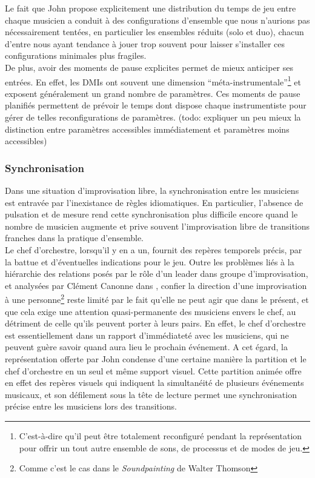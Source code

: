 \noindent Le fait que John propose explicitement une distribution du temps de jeu entre chaque musicien a conduit à des configurations d'ensemble que nous n'aurions pas nécessairement tentées, en particulier les ensembles réduits (solo et duo), chacun d'entre nous ayant tendance à jouer trop souvent pour laisser s'installer ces configurations minimales plus fragiles.\\
\indent De plus, avoir des moments de pause explicites permet de mieux anticiper ses entrées. En effet, les \glspl{DMI} ont souvent une dimension ``méta-instrumentale''\footnote{C'est-à-dire qu'il peut être totalement reconfiguré pendant la représentation pour offrir un tout autre ensemble de sons, de processus et de modes de jeu.} et exposent généralement un grand nombre de paramètres. Ces moments de pause planifiés permettent de prévoir le temps dont dispose chaque instrumentiste pour gérer de telles reconfigurations de paramètres. (todo: expliquer un peu mieux la distinction entre paramètres accessibles immédiatement et paramètres moins accessibles)

\subsubsection{Synchronisation}

\noindent Dans une situation d'improvisation libre, la synchronisation entre les musiciens est entravée par l'inexistance de règles idiomatiques. En particulier, l'absence de pulsation et de mesure rend cette synchronisation plus difficile encore quand le nombre de musicien augmente et prive souvent l'improvisation libre de transitions franches dans la pratique d'ensemble.\\
\indent Le chef d'orchestre, lorsqu'il y en a un, fournit des repères temporels précis, par la battue et d'éventuelles indications pour le jeu. Outre les problèmes liés à la hiérarchie des relations posés par le rôle d'un leader dans groupe d'improvisation, et analysées par Clément Canonne dans \cite{canonne_improvisation_2012}, confier la direction d'une improvisation à une personne\footnote{Comme c'est le cas dans le \textit{Soundpainting} de Walter Thomson} reste limité par le fait qu'elle ne peut agir que dans le présent, et que cela exige une attention quasi-permanente des musiciens envers le chef, au détriment de celle qu'ils peuvent porter à leurs pairs. En effet, le chef d'orchestre est essentiellement dans un rapport d'immédiateté avec les musiciens, qui ne peuvent guère savoir quand aura lieu le prochain événement. A cet égard, la représentation offerte par John condense d'une certaine manière la partition et le chef d'orchestre en un seul et même support visuel. Cette partition animée offre en effet des repères visuels qui indiquent la simultanéité de plusieurs événements musicaux, et son défilement sous la tête de lecture permet une synchronisation précise entre les musiciens lors des transitions.

